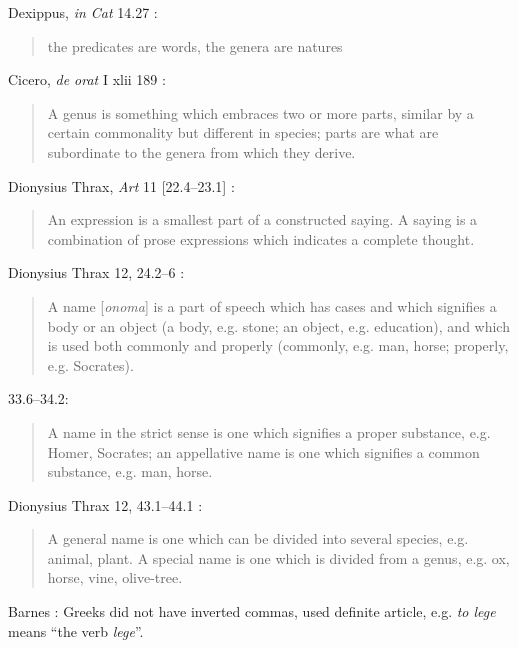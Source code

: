 \documentclass{article}
\begin{document}
Dexippus, {\em in Cat} 14.27 \cite[p.~76]{isagoge}:

\begin{quote}
the predicates are words, the genera are natures
\end{quote}





Cicero, {\em de orat} I xlii 189 \cite[p.~63]{isagoge}:

\begin{quote}
A genus is something which embraces two or more parts, similar by a certain commonality but different in species; parts are what are subordinate to the genera from which they derive.
\end{quote}

Dionysius Thrax, {\em Art} 11 [22.4--23.1] \cite[p.~207]{barnes}:

\begin{quote}
An expression is a smallest part of a constructed saying. A saying is a combination of prose expressions which indicates a complete thought.
\end{quote}

Dionysius Thrax 12, 24.2--6 \cite[p.~315]{isagoge}:

\begin{quote}
A name [{\em onoma}] is a part of speech which has cases and which signifies a body or an object (a body, e.g. stone; an object, e.g. education), and which is used both commonly and properly (commonly, e.g. man, horse; properly, e.g. Socrates).
\end{quote}

33.6--34.2:

\begin{quote}
A name in the strict sense is one which signifies a proper substance, e.g. Homer, Socrates; an appellative name is one which signifies a common substance, e.g. man, horse.
\end{quote}

Dionysius Thrax 12, 43.1--44.1 \cite[p.~64]{isagoge}:

\begin{quote}
A general name is one which can be divided into several species, e.g. animal, plant. A special name is one which is divided from a genus, e.g. ox, horse, vine, olive-tree.
\end{quote}

Barnes \cite[pp.~319--320]{isagoge}: Greeks did not have inverted commas, used definite article, e.g. {\em to lege} means ``the verb {\em lege}''.
\end{document}

